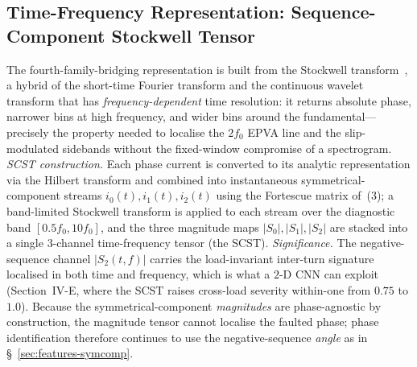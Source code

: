 \documentclass[journal]{IEEEtran}
\begin{document}
\subsection{Time-Frequency Representation: Sequence-Component Stockwell Tensor}
\label{sec:features-tf}
The fourth-family-bridging representation is built from the Stockwell
transform~\cite{stockwell1996}, a hybrid of the short-time Fourier transform and the
continuous wavelet transform that has \emph{frequency-dependent} time resolution: it
returns absolute phase, narrower bins at high frequency, and wider bins around the
fundamental---precisely the property needed to localise the $2f_0$ EPVA line and the
slip-modulated sidebands without the fixed-window compromise of a spectrogram.
\emph{SCST construction.} Each phase current is converted to its analytic representation
via the Hilbert transform and combined into instantaneous symmetrical-component streams
$i_0(t), i_1(t), i_2(t)$ using the Fortescue matrix of~(3); a band-limited Stockwell
transform is applied to each stream over the diagnostic band
$[0.5 f_0, 10 f_0]$, and the three magnitude maps $|S_0|, |S_1|, |S_2|$ are stacked into a
single $3$-channel time-frequency tensor (the SCST). \emph{Significance.} The
negative-sequence channel $|S_2(t,f)|$ carries the load-invariant inter-turn signature
localised in both time and frequency, which is what a $2$-D CNN can exploit
(Section~IV-E, where the SCST raises cross-load severity within-one from $0.75$ to
$1.0$). Because the symmetrical-component \emph{magnitudes} are phase-agnostic by
construction, the magnitude tensor cannot localise the faulted phase; phase
identification therefore continues to use the negative-sequence \emph{angle} as in
\S~\ref{sec:features-symcomp}.
\end{document}
